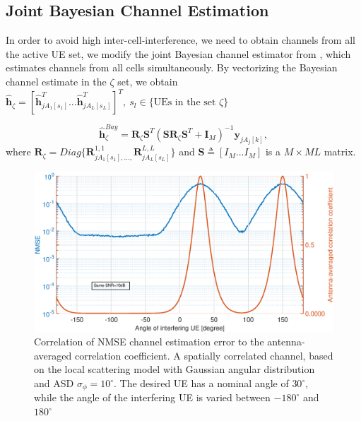 \subsection{Joint Bayesian Channel Estimation}
In order to avoid high inter-cell-interference, we need to obtain channels from all the active UE set, we modify the joint Bayesian channel estimator from \cite{yin2013coordinated}, which estimates channels from all cells simultaneously. By vectorizing the Bayesian channel estimate in the $\zeta$ set, we obtain $\hat{\mathbf{h}}_{\zeta}=[\hat{\mathbf{h}}_{jA_{1}[s_{1}]}^{T}...\hat{\mathbf{h}}_{jA_{L}[s_{L}]}^{T}]^{T},\:s_{l}\in \{\text{UEs in the set } \zeta\}$ 

\begin{equation}
\hat{\mathbf{h}}_{\zeta}^{Bay}=\mathbf{R}_{\zeta}\mathbf{S}^{T}%
(\mathbf{S}\mathbf{R}_{\zeta}\mathbf{S}^{T}+\mathbf{I}_{M})^{-1}\mathbf{y}_{jA_{j}[k]},
\end{equation}
where $\mathbf{R}_{\zeta}=Diag\{\mathbf{R}^{1,1}_{jA_{1}[s_{1}],...,}\mathbf{R}^{L,L}_{jA_{L}[s_{L}]}\} $ and %
$\mathbf{S}\triangleq[I_{M}...I_{M}]$ is a $M\times ML$ matrix.





\begin{figure}[t!]
	\centering
	\includegraphics[width=1.0\linewidth]{figures/NMSE_correlation.eps}
	\caption{Correlation of NMSE channel estimation error to the antenna-averaged correlation coefficient. A spatially correlated channel, based on
the local scattering model with Gaussian angular distribution and ASD $ \sigma_\phi= 10^\circ$. The desired UE has a nominal angle of $30^\circ$, while the angle of the interfering UE
is varied between $-180^\circ$ and $180^\circ$}
	\label{fig:channel_correlation_model}
\end{figure}















